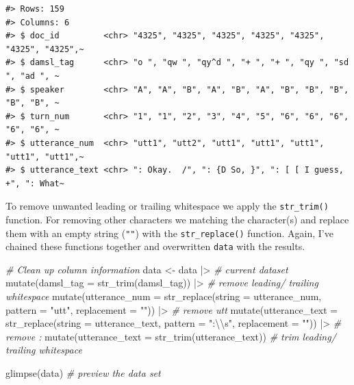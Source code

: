 \documentclass[
  letterpaper,
]{latex/krantz}
\newenvironment{Shaded}{\begin{snugshade}}{\end{snugshade}}
\newcommand{\AttributeTok}[1]{\textcolor[rgb]{0.00,0.00,0.00}{#1}}
\newcommand{\CommentTok}[1]{\textcolor[rgb]{0.00,0.00,0.00}{\textit{#1}}}
\newcommand{\FunctionTok}[1]{\textcolor[rgb]{0.00,0.00,0.00}{#1}}
\newcommand{\NormalTok}[1]{\textcolor[rgb]{0.00,0.00,0.00}{#1}}
\newcommand{\OtherTok}[1]{\textcolor[rgb]{0.00,0.00,0.00}{#1}}
\newcommand{\SpecialCharTok}[1]{\textcolor[rgb]{0.00,0.00,0.00}{#1}}
\newcommand{\StringTok}[1]{\textcolor[rgb]{0.00,0.00,0.00}{#1}}
\begin{document}
\begin{verbatim}
#> Rows: 159
#> Columns: 6
#> $ doc_id         <chr> "4325", "4325", "4325", "4325", "4325", "4325", "4325",~
#> $ damsl_tag      <chr> "o ", "qw ", "qy^d ", "+ ", "+ ", "qy ", "sd ", "ad ", ~
#> $ speaker        <chr> "A", "A", "B", "A", "B", "A", "B", "B", "B", "B", "B", ~
#> $ turn_num       <chr> "1", "1", "2", "3", "4", "5", "6", "6", "6", "6", "6", ~
#> $ utterance_num  <chr> "utt1", "utt2", "utt1", "utt1", "utt1", "utt1", "utt1",~
#> $ utterance_text <chr> ": Okay.  /", ": {D So, }", ": [ [ I guess, +", ": What~
\end{verbatim}

To remove unwanted leading or trailing whitespace we apply the
\texttt{str\_trim()} function. For removing other characters we matching
the character(s) and replace them with an empty string (\texttt{""})
with the \texttt{str\_replace()} function. Again, I've chained these
functions together and overwritten \texttt{data} with the results.

\begin{Shaded}
\begin{Highlighting}[]
\CommentTok{\# Clean up column information}
\NormalTok{data }\OtherTok{\textless{}{-}} 
\NormalTok{  data }\SpecialCharTok{|\textgreater{}} \CommentTok{\# current dataset}
  \FunctionTok{mutate}\NormalTok{(}\AttributeTok{damsl\_tag =} \FunctionTok{str\_trim}\NormalTok{(damsl\_tag)) }\SpecialCharTok{|\textgreater{}} \CommentTok{\# remove leading/ trailing whitespace}
  \FunctionTok{mutate}\NormalTok{(}\AttributeTok{utterance\_num =} \FunctionTok{str\_replace}\NormalTok{(}\AttributeTok{string =}\NormalTok{ utterance\_num, }\AttributeTok{pattern =} \StringTok{"utt"}\NormalTok{, }\AttributeTok{replacement =} \StringTok{""}\NormalTok{)) }\SpecialCharTok{|\textgreater{}} \CommentTok{\# remove \textquotesingle{}utt\textquotesingle{}}
  \FunctionTok{mutate}\NormalTok{(}\AttributeTok{utterance\_text =} \FunctionTok{str\_replace}\NormalTok{(}\AttributeTok{string =}\NormalTok{ utterance\_text, }\AttributeTok{pattern =} \StringTok{":}\SpecialCharTok{\textbackslash{}\textbackslash{}}\StringTok{s"}\NormalTok{, }\AttributeTok{replacement =} \StringTok{""}\NormalTok{)) }\SpecialCharTok{|\textgreater{}} \CommentTok{\# remove \textquotesingle{}: \textquotesingle{}}
  \FunctionTok{mutate}\NormalTok{(}\AttributeTok{utterance\_text =} \FunctionTok{str\_trim}\NormalTok{(utterance\_text)) }\CommentTok{\# trim leading/ trailing whitespace}

\FunctionTok{glimpse}\NormalTok{(data) }\CommentTok{\# preview the data set}
\end{Highlighting}
\end{Shaded}
\end{document}
